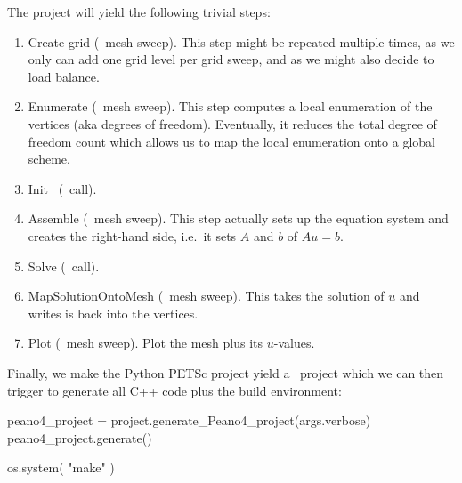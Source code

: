 \noindent
The project will yield the following trivial steps:
\begin{enumerate}
  \item Create grid (\Peano\ mesh sweep). This step might be repeated multiple
  times, as we only can add one grid level per grid sweep, and as we might also decide to load balance.
  \item Enumerate (\Peano\ mesh sweep). This step computes a local enumeration
  of the vertices (aka degrees of freedom).
  Eventually, it reduces the total degree of freedom count which allows us to
  map the local enumeration onto a global scheme.
  \item Init \PETSc\ (\PETSc\ call).
  \item Assemble (\Peano\ mesh sweep). This step actually sets up the equation
  system and creates the right-hand side, i.e.~it sets $A$ and $b$ of $Au=b$.
  \item Solve (\PETSc\ call).
  \item MapSolutionOntoMesh (\Peano\ mesh sweep). This takes the solution of $u$
  and writes is back into the vertices.
  \item Plot (\Peano\ mesh sweep). Plot the mesh plus its $u$-values.
\end{enumerate}


\noindent
Finally, we make the Python PETSc project yield a \Peano\ project which we can
then trigger to generate all C++ code plus the build environment:

\begin{code}
peano4_project = project.generate_Peano4_project(args.verbose)
peano4_project.generate()

os.system( "make" )
\end{code}


